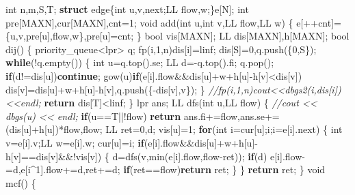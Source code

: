 \documentclass[
]{article}
\newenvironment{Shaded}{}{}
\newcommand{\CommentTok}[1]{\textcolor[rgb]{0.38,0.63,0.69}{\textit{#1}}}
\newcommand{\ControlFlowTok}[1]{\textcolor[rgb]{0.00,0.44,0.13}{\textbf{#1}}}
\newcommand{\DataTypeTok}[1]{\textcolor[rgb]{0.56,0.13,0.00}{#1}}
\newcommand{\DecValTok}[1]{\textcolor[rgb]{0.25,0.63,0.44}{#1}}
\newcommand{\KeywordTok}[1]{\textcolor[rgb]{0.00,0.44,0.13}{\textbf{#1}}}
\newcommand{\NormalTok}[1]{#1}
\begin{document}
\begin{Shaded}
\begin{Highlighting}[]
\DataTypeTok{int}\NormalTok{ n,m,S,T;}
\KeywordTok{struct}\NormalTok{ edge\{}\DataTypeTok{int}\NormalTok{ u,v,next;LL flow,w;\}e[N];}
\DataTypeTok{int}\NormalTok{ pre[MAXN],cur[MAXN],cnt=}\DecValTok{1}\NormalTok{;}
\DataTypeTok{void}\NormalTok{ add(}\DataTypeTok{int}\NormalTok{ u,}\DataTypeTok{int}\NormalTok{ v,LL flow,LL w)}
\NormalTok{\{}
\NormalTok{    e[++cnt]=\{u,v,pre[u],flow,w\},pre[u]=cnt;}
\NormalTok{\}}
\DataTypeTok{bool}\NormalTok{ vis[MAXN];}
\NormalTok{LL dis[MAXN],h[MAXN];}
\DataTypeTok{bool}\NormalTok{ dij()}
\NormalTok{\{}
\NormalTok{    priority\_queue\textless{}lpr\textgreater{} q;}
\NormalTok{    fp(i,}\DecValTok{1}\NormalTok{,n)dis[i]=linf;}
\NormalTok{    dis[S]=}\DecValTok{0}\NormalTok{,q.push(\{}\DecValTok{0}\NormalTok{,S\});}
    \ControlFlowTok{while}\NormalTok{(!q.empty())}
\NormalTok{    \{}
        \DataTypeTok{int}\NormalTok{ u=q.top().se; LL d={-}q.top().fi; q.pop();}
        \ControlFlowTok{if}\NormalTok{(d!=dis[u])}\ControlFlowTok{continue}\NormalTok{;}
\NormalTok{        gow(u)}\ControlFlowTok{if}\NormalTok{(e[i].flow\&\&dis[u]+w+h[u]{-}h[v]\textless{}dis[v])}
\NormalTok{            dis[v]=dis[u]+w+h[u]{-}h[v],q.push(\{{-}dis[v],v\});}
\NormalTok{    \}}
    \CommentTok{//fp(i,1,n)cout\textless{}\textless{}dbgs2(i,dis[i])\textless{}\textless{}endl;}
    \ControlFlowTok{return}\NormalTok{ dis[T]\textless{}linf;}
\NormalTok{\}}
\NormalTok{lpr ans;}
\NormalTok{LL dfs(}\DataTypeTok{int}\NormalTok{ u,LL flow)}
\NormalTok{\{}
    \CommentTok{//cout \textless{}\textless{} dbgs(u) \textless{}\textless{} endl;}
    \ControlFlowTok{if}\NormalTok{(u==T||!flow) }\ControlFlowTok{return}\NormalTok{ ans.fi+=flow,ans.se+=(dis[u]+h[u])*flow,flow;}
\NormalTok{    LL ret=}\DecValTok{0}\NormalTok{,d; vis[u]=}\DecValTok{1}\NormalTok{;}
    \ControlFlowTok{for}\NormalTok{(}\DataTypeTok{int}\NormalTok{ i=cur[u];i;i=e[i].next)}
\NormalTok{    \{}
        \DataTypeTok{int}\NormalTok{ v=e[i].v;LL w=e[i].w; cur[u]=i;}
        \ControlFlowTok{if}\NormalTok{(e[i].flow\&\&dis[u]+w+h[u]{-}h[v]==dis[v]\&\&!vis[v])}
\NormalTok{        \{}
\NormalTok{            d=dfs(v,min(e[i].flow,flow{-}ret));}
            \ControlFlowTok{if}\NormalTok{(d) e[i].flow{-}=d,e[i\^{}}\DecValTok{1}\NormalTok{].flow+=d,ret+=d;}
            \ControlFlowTok{if}\NormalTok{(ret==flow)}\ControlFlowTok{return}\NormalTok{ ret;}
\NormalTok{        \}}
\NormalTok{    \}}
    \ControlFlowTok{return}\NormalTok{ ret;}
\NormalTok{\}}
\DataTypeTok{void}\NormalTok{ mcf()}
\NormalTok{\{}

\end{Highlighting}
\end{Shaded}
\end{document}
